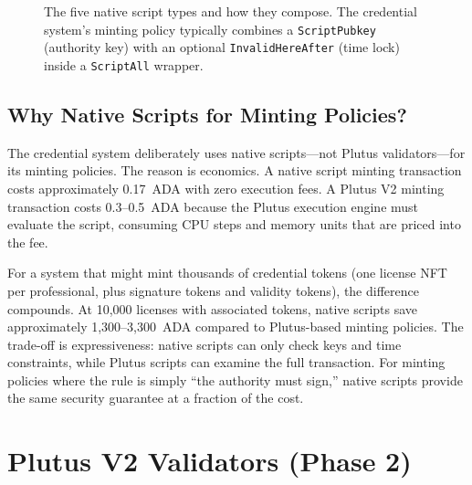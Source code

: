 \begin{figure}[H]
\caption{The five native script types and how they compose. The credential system's minting policy typically combines a \texttt{ScriptPubkey} (authority key) with an optional \texttt{InvalidHereAfter} (time lock) inside a \texttt{ScriptAll} wrapper.}
\label{fig:native-scripts}
\end{figure}

\subsection{Why Native Scripts for Minting Policies?}

The credential system deliberately uses native scripts---not Plutus
validators---for its minting policies. The reason is economics. A
native script minting transaction costs approximately 0.17~ADA with
zero execution fees. A Plutus V2 minting transaction costs 0.3--0.5~ADA
because the Plutus execution engine must evaluate the script, consuming
CPU steps and memory units that are priced into the fee.

For a system that might mint thousands of credential tokens (one license
NFT per professional, plus signature tokens and validity tokens), the
difference compounds. At 10,000 licenses with associated tokens, native
scripts save approximately 1,300--3,300~ADA compared to Plutus-based
minting policies. The trade-off is expressiveness: native scripts can
only check keys and time constraints, while Plutus scripts can examine
the full transaction. For minting policies where the rule is simply
``the authority must sign,'' native scripts provide the same security
guarantee at a fraction of the cost.


\section{Plutus V2 Validators (Phase 2)}
\label{sec:plutus-v2}

